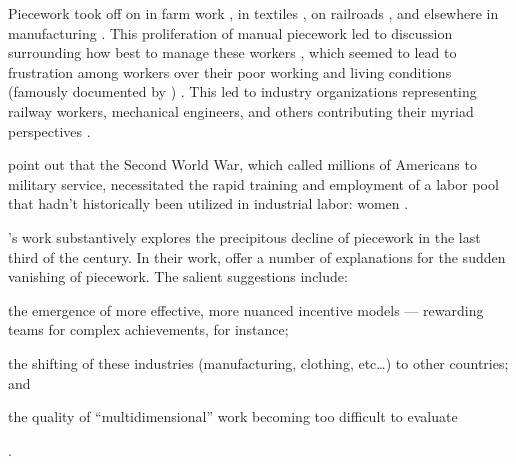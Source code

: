 \documentclass[trackingWork]{subfiles}
\begin{document}
Piecework took off on in farm work \cite{hughRaynbirdTaskWork},
in textiles \cite{restructuringPieceworkBaker,riisOtherSideLives},
on railroads \cite{Brown01041990}, and 
elsewhere in manufacturing \cite{10.2307/3827491}.
This proliferation of manual piecework led to discussion surrounding how best to manage these workers
\cite{norton1900textile,clark1908cotton},
which seemed to lead to frustration among workers over their poor working and living conditions
(famously documented by
\citeauthor{riisOtherSideLives})
\cite{riisOtherSideLives}.
This led to industry organizations representing
railway workers, mechanical engineers, and others contributing their myriad perspectives
\cite{american1921problem,richards1904anything}.


\citeauthor{hart2013rise} point out that the Second World War,
which called millions of Americans to military service,
necessitated the rapid training and employment of
a labor pool that hadn't historically been utilized in industrial labor: women
\cite{hart2013rise}.

\citeauthor{hart2013rise}'s work substantively explores the precipitous decline of piecework in the last third of the  century.
In their work, \citeauthor{hart2013rise} offer a number of explanations for the sudden vanishing of piecework.
The salient suggestions include:
\begin{inlinelist}
\item the emergence of more effective, more nuanced incentive models
--- rewarding teams for complex achievements, for instance;
\item the shifting of these industries (manufacturing, clothing, etc\dots)
to other countries; and
\item the quality of ``multidimensional'' work becoming too difficult to evaluate
\end{inlinelist}
\cite{hart2013rise}.
\end{document}
